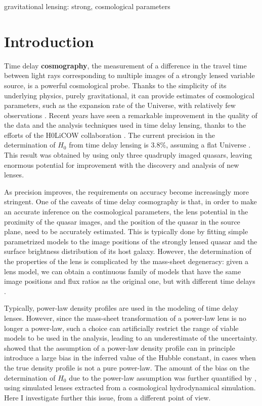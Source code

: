 \documentclass[usenatbib]{mnras}
\begin{document}
\begin{keywords}
   gravitational lensing: strong, cosmological parameters
\end{keywords}

\section{Introduction}\label{sect:intro}

Time delay {\bf cosmography}, the measurement of a difference in the travel time between light rays corresponding to multiple images of a strongly lensed variable source, is a powerful cosmological probe. Thanks to the simplicity of its underlying physics, purely gravitational, it can provide estimates of cosmological parameters, such as the expansion rate of the Universe, with relatively few observations \citep[see][for a review]{T+M16}.
Recent years have seen a remarkable improvement in the quality of the data and the analysis techniques used in time delay lensing, thanks to the efforts of the H0LiCOW collaboration \citep{Suy++17}.
The current precision in the determination of $H_0$ from time delay lensing is $3.8\%$, assuming a flat Universe \citep{Bon++17}.
This result was obtained by using only three quadruply imaged quasars, leaving enormous potential for improvement with the discovery and analysis of new lenses.

As precision improves, the requirements on accuracy become increasingly more stringent.
One of the caveats of time delay cosmography is that, in order to make an accurate inference on the cosmological parameters, the lens potential in the proximity of the quasar images, and the position of the quasar in the source plane, need to be accurately estimated.
This is typically done by fitting simple parametrized models to the image positions of the strongly lensed quasar and the surface brightness distribution of its host galaxy.
However, the determination of the properties of the lens is complicated by the mass-sheet degeneracy: given a lens model, we can obtain a continuous family of models that have the same image positions and flux ratios as the original one, but with different time delays \citep{FGS85}.

Typically, power-law density profiles are used in the modeling of time delay lenses.
However, since the mass-sheet transformation of a power-law lens is no longer a power-law, such a choice can artificially restrict the range of viable models to be used in the analysis, leading to an underestimate of the uncertainty.
\citet{S+S13} showed that the assumption of a power-law density profile can in principle introduce a large bias in the inferred value of the Hubble constant, in cases when the true density profile is not a pure power-law.
The amount of the bias on the determination of $H_0$ due to the power-law assumption was further quantified by \citet{Xu++16}, using simulated lenses extracted from a cosmological hydrodynamical simulation.
Here I investigate further this issue, from a different point of view.
\end{document}
